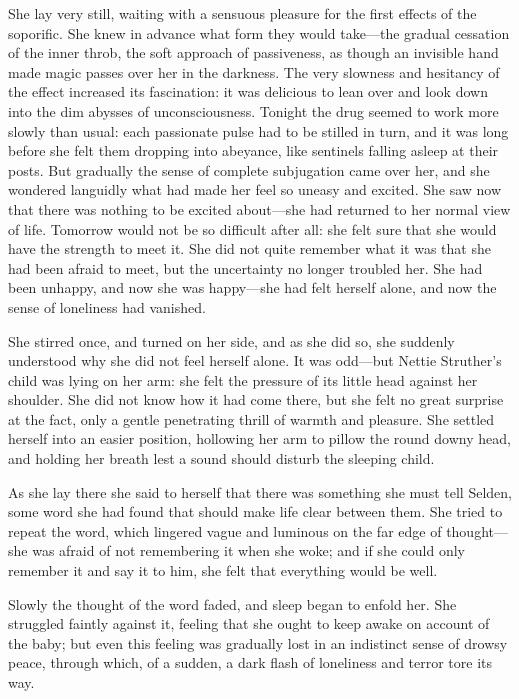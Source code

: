 \documentclass[12pt,a4paper]{book}
\begin{document}
She lay very still, waiting with a sensuous pleasure for the
first effects of the soporific. She knew in advance what form
they would take---the gradual cessation of the inner throb, the
soft approach of passiveness, as though an invisible hand made
magic passes over her in the darkness. The very slowness and
hesitancy of the effect increased its fascination: it was
delicious to lean over and look down into the dim abysses of
unconsciousness. Tonight the drug seemed to work more slowly than
usual: each passionate pulse had to be stilled in turn, and it
was long before she felt them dropping into abeyance, like
sentinels falling asleep at their posts. But gradually the sense
of complete subjugation came over her, and she wondered languidly
what had made her feel so uneasy and excited. She saw now that
there was nothing to be excited about---she had returned to her
normal view of life. Tomorrow would not be so difficult after
all: she felt sure that she would have the strength to meet it. 
She did not quite remember what it was that she had been afraid
to meet, but the uncertainty no longer troubled her. She had been
unhappy, and now she was happy---she had felt herself alone, and
now the sense of loneliness had vanished.





She stirred once, and turned on her side, and as she did so, she
suddenly understood why she did not feel herself alone. It was
odd---but Nettie Struther's child was lying on her arm: she felt
the pressure of its little head against her shoulder. She did not
know how it had come there, but she felt no great surprise at the
fact, only a gentle penetrating thrill of warmth and pleasure. 
She settled herself into an easier position, hollowing her arm to
pillow the round downy head, and holding her breath lest
a sound should disturb the sleeping child.





As she lay there she said to herself that there was something she
must tell Selden, some word she had found that should make life
clear between them. She tried to repeat the word, which lingered
vague and luminous on the far edge of thought---she was afraid of
not remembering it when she woke; and if she could only remember
it and say it to him, she felt that everything would be well.





Slowly the thought of the word faded, and sleep began to enfold
her. She struggled faintly against it, feeling that she ought to
keep awake on account of the baby; but even this feeling was
gradually lost in an indistinct sense of drowsy peace, through
which, of a sudden, a dark flash of loneliness and terror tore
its way.
\end{document}
